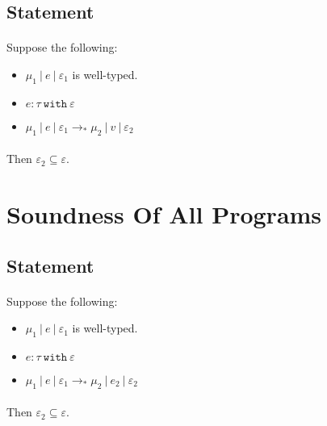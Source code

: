 \documentclass{llncs}
\newcommand{\keywadj}[1]{\mathtt{#1}}
\newcommand{\keyw}[1]{\keywadj{#1}~}
\begin{document}
\subsection{Statement}

\paragraph{}
Suppose the following:
\begin{itemize}
	\item $\mu_1~|~e~|~\varepsilon_1$ is well-typed.
	\item $e : \tau~\keyw{with} \varepsilon$
	\item $\mu_1~|~e~|~\varepsilon_1 \longrightarrow_* \mu_2~|~v~|~\varepsilon_2$
\end{itemize}

\paragraph{}
Then $\varepsilon_2 \subseteq \varepsilon$.


\section{Soundness Of All Programs}

\subsection{Statement}

\paragraph{}
Suppose the following:
\begin{itemize}
	\item $\mu_1~|~e~|~\varepsilon_1$ is well-typed.
	\item $e : \tau~\keyw{with} \varepsilon$
	\item $\mu_1~|~e~|~\varepsilon_1 \longrightarrow_* \mu_2~|~e_2~|~\varepsilon_2$
\end{itemize}

\paragraph{}
Then $\varepsilon_2 \subseteq \varepsilon$.
\end{document}
